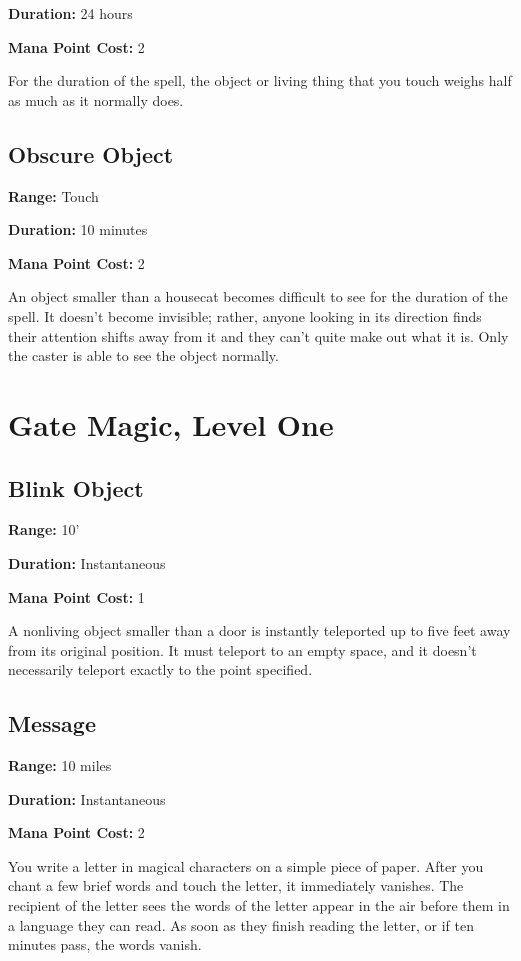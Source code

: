 \begin{multicols}{2}
\textbf{Duration:} 24 hours

\textbf{Mana Point Cost:} 2

For the duration of the spell, the object or living thing that you touch
weighs half as much as it normally does.

\subsection{Obscure Object}

\textbf{Range:} Touch

\textbf{Duration:} 10 minutes

\textbf{Mana Point Cost:} 2

An object smaller than a housecat becomes difficult to
see for the duration of the spell. It doesn't become
invisible; rather, anyone looking in its direction finds
their attention shifts away from it and they can't quite
make out what it is. Only the caster is able to see the
object normally.

\section{Gate Magic, Level One}

\subsection{Blink Object}

\textbf{Range:} 10'

\textbf{Duration:} Instantaneous

\textbf{Mana Point Cost:} 1

A nonliving object smaller than a door is instantly teleported
up to five feet away from its original position. It must teleport
to an empty space, and it doesn't necessarily teleport exactly
to the point specified.

\subsection{Message}

\textbf{Range:} 10 miles

\textbf{Duration:} Instantaneous

\textbf{Mana Point Cost:} 2

You write a letter in magical characters on a simple piece of
paper. After you chant a few brief words and touch the letter,
it immediately vanishes. The recipient of the letter sees the
words of the letter appear in the air before them in a language
they can read. As soon as they finish reading the letter, or
if ten minutes pass, the words vanish.


\end{multicols}
